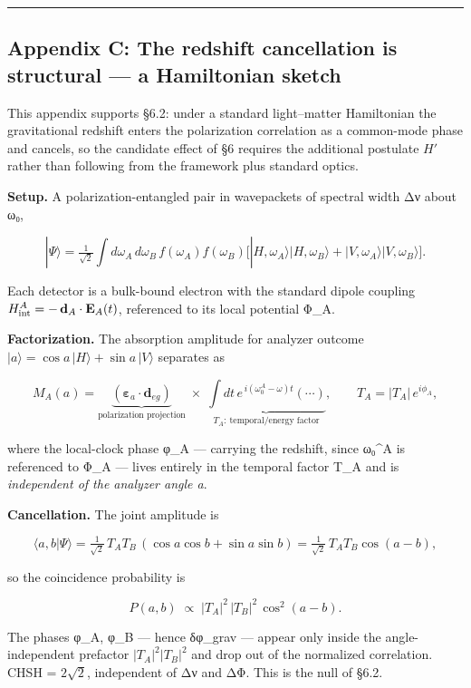 \documentclass[
]{article}
\begin{document}
\begin{center}\rule{0.5\linewidth}{0.5pt}\end{center}

\subsection{Appendix C: The redshift cancellation is structural --- a
Hamiltonian
sketch}\label{appendix-c-the-redshift-cancellation-is-structural-a-hamiltonian-sketch}

This appendix supports §6.2: under a standard light--matter Hamiltonian
the gravitational redshift enters the polarization correlation as a
common-mode phase and cancels, so the candidate effect of §6 requires
the additional postulate \(H'\) rather than following from the framework
plus standard optics.

\textbf{Setup.} A polarization-entangled pair in wavepackets of spectral
width Δν about ω₀,

\[|\Psi\rangle = \tfrac{1}{\sqrt2}\!\int\! d\omega_A\,d\omega_B\, f(\omega_A)f(\omega_B)\big[|H,\omega_A\rangle|H,\omega_B\rangle + |V,\omega_A\rangle|V,\omega_B\rangle\big].\]

Each detector is a bulk-bound electron with the standard dipole coupling
\(H^{A}_{\rm int} = -\,\mathbf d_A\cdot\mathbf E_A(t)\), referenced to
its local potential Φ\_A.

\textbf{Factorization.} The absorption amplitude for analyzer outcome
\(|a\rangle=\cos a\,|H\rangle+\sin a\,|V\rangle\) separates as

\[M_A(a) = \underbrace{(\boldsymbol\varepsilon_a\cdot\mathbf d_{eg})}_{\text{polarization projection}}\;\times\;\underbrace{\textstyle\int dt\, e^{\,i(\omega_0^A-\omega)t}(\cdots)}_{T_A:\ \text{temporal/energy factor}},\qquad T_A=|T_A|\,e^{i\phi_A},\]

where the local-clock phase φ\_A --- carrying the redshift, since
ω₀\^{}A is referenced to Φ\_A --- lives entirely in the temporal factor
T\_A and is \emph{independent of the analyzer angle a}.

\textbf{Cancellation.} The joint amplitude is

\[\langle a,b|\Psi\rangle = \tfrac1{\sqrt2}\,T_AT_B\,(\cos a\cos b+\sin a\sin b)=\tfrac1{\sqrt2}\,T_AT_B\cos(a-b),\]

so the coincidence probability is

\[P(a,b)\;\propto\; |T_A|^2\,|T_B|^2\,\cos^2(a-b).\]

The phases φ\_A, φ\_B --- hence δφ\_grav --- appear only inside the
angle-independent prefactor \(|T_A|^2|T_B|^2\) and drop out of the
normalized correlation. CHSH = \(2\sqrt{2}\), independent of Δν and ΔΦ.
This is the null of §6.2.
\end{document}
